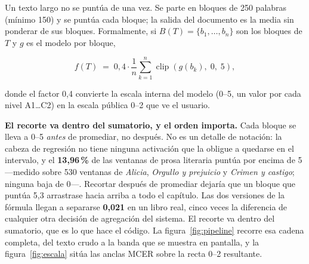\documentclass[11pt,a4paper]{article}
\newcommand{\pct}{\,\%}
\begin{document}
Un texto largo no se puntúa de una vez. Se parte en bloques de 250 palabras (mínimo
150) y se puntúa cada bloque; la salida del documento es la media sin ponderar de sus
bloques. Formalmente, si $B(T) = \{b_1, \dots, b_n\}$ son los bloques de $T$ y $g$ es
el modelo por bloque,

\begin{equation}
f(T) \;=\; 0{,}4 \cdot \frac{1}{n}\sum_{k=1}^{n} \operatorname{clip}\!\left(g(b_k),\; 0,\; 5\right),
\label{eq:f}
\end{equation}

\noindent donde el factor 0,4 convierte la escala interna del modelo (0--5, un valor
por cada nivel A1\dots C2) en la escala pública 0--2 que ve el usuario.

\textbf{El recorte va dentro del sumatorio, y el orden importa.} Cada bloque se lleva a
0--5 \emph{antes} de promediar, no después. No es un detalle de notación: la cabeza de
regresión no tiene ninguna activación que la obligue a quedarse en el intervalo, y el
\textbf{13,96\pct} de las ventanas de prosa literaria puntúa por encima de 5 —medido
sobre 530 ventanas de \emph{Alicia}, \emph{Orgullo y prejuicio} y \emph{Crimen y
castigo}; ninguna baja de 0—. Recortar después de promediar dejaría que un bloque que
puntúa 5,3 arrastrase hacia arriba a todo el capítulo. Las dos versiones de la fórmula
llegan a separarse \textbf{0,021} en un libro real, cinco veces la diferencia de
cualquier otra decisión de agregación del sistema. El recorte va dentro del sumatorio,
que es lo que hace el código. La
figura~\ref{fig:pipeline} recorre esa cadena completa, del texto crudo a la banda que
se muestra en pantalla, y la figura~\ref{fig:escala} sitúa las anclas MCER sobre la
recta 0--2 resultante.
\end{document}
